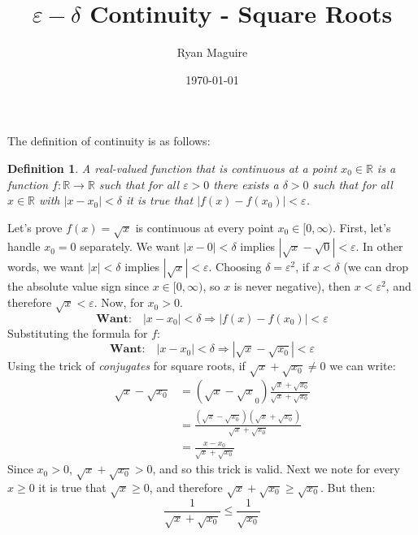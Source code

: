 \documentclass{article}
\title{$\varepsilon-\delta$ Continuity - Square Roots}
\author{Ryan Maguire}
\date{\today}
\theoremstyle{normal}
\newtheorem{definition}{Definition}
\theoremstyle{plain}
\begin{document}
    \maketitle
    The definition of continuity is as follows:
    \begin{definition}
        A real-valued function that is continuous at a point
        $x_{0}\in\mathbb{R}$ is a function $f:\mathbb{R}\rightarrow\mathbb{R}$
        such that for all $\varepsilon>0$ there exists a $\delta>0$ such that
        for all $x\in\mathbb{R}$ with $|x-x_{0}|<\delta$ it is true that
        $|f(x)-f(x_{0})|<\varepsilon$.
    \end{definition}
    Let's prove $f(x)=\sqrt{x}$ is continuous at every point
    $x_{0}\in[0,\infty)$. First, let's handle $x_{0}=0$ separately. We want
    $|x-0|<\delta$ implies $|\sqrt{x}-\sqrt{0}|<\varepsilon$. In other
    words, we want $|x|<\delta$ implies $|\sqrt{x}|<\varepsilon$. Choosing
    $\delta=\varepsilon^{2}$, if $x<\delta$ (we can drop the absolute value
    sign since $x\in[0,\infty)$, so $x$ is never negative), then
    $x<\varepsilon^{2}$, and therefore $\sqrt{x}<\varepsilon$. Now, for
    $x_{0}>0$.
    \begin{equation}
        \textbf{Want:}\quad
        |x-x_{0}|<\delta\Rightarrow
        |f(x)-f(x_{0})|<\varepsilon
    \end{equation}
    Substituting the formula for $f$:
    \begin{equation}
        \textbf{Want:}\quad
        |x-x_{0}|<\delta\Rightarrow
        |\sqrt{x}-\sqrt{x_{0}}|<\varepsilon
    \end{equation}
    Using the trick of \textit{conjugates} for square roots, if
    $\sqrt{x}+\sqrt{x_{0}}\ne{0}$ we can write:
    \begin{align}
        \sqrt{x}-\sqrt{x_{0}}
        &=(\sqrt{x}-\sqrt{x}_{0})
            \frac{\sqrt{x}+\sqrt{x_{0}}}{\sqrt{x}+\sqrt{x_{0}}}\\
        &=\frac{(\sqrt{x}-\sqrt{x_{0}})(\sqrt{x}+\sqrt{x_{0}})}
              {\sqrt{x}+\sqrt{x_{0}}}\\
        &=\frac{x-x_{0}}{\sqrt{x}+\sqrt{x_{0}}}
    \end{align}
    Since $x_{0}>0$, $\sqrt{x}+\sqrt{x_{0}}>0$, and so this
    trick is valid. Next we note for every $x\geq{0}$ it is true that
    $\sqrt{x}\geq{0}$, and therefore $\sqrt{x}+\sqrt{x_{0}}\geq\sqrt{x_{0}}$.
    But then:
    \begin{equation}
        \frac{1}{\sqrt{x}+\sqrt{x_{0}}}\leq\frac{1}{\sqrt{x_{0}}}
    \end{equation}
\end{document}
